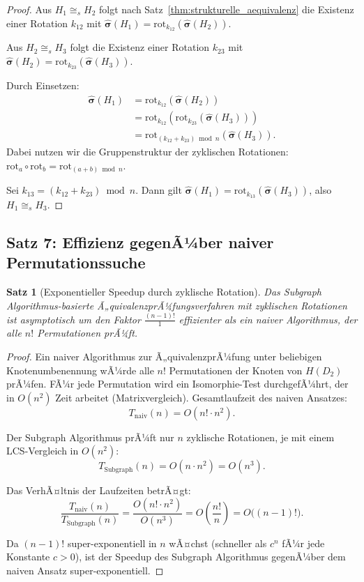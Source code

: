 ﻿\documentclass[12pt,a4paper]{report}
\newtheorem{theorem}{Satz}[section]
\begin{document}
\begin{proof}
Aus $H_1 \cong_s H_2$ folgt nach Satz~\ref{thm:strukturelle_aequivalenz} die Existenz einer Rotation $k_{12}$ mit $\hat{\boldsymbol{\sigma}}(H_1) = \mathrm{rot}_{k_{12}}(\hat{\boldsymbol{\sigma}}(H_2))$.

Aus $H_2 \cong_s H_3$ folgt die Existenz einer Rotation $k_{23}$ mit $\hat{\boldsymbol{\sigma}}(H_2) = \mathrm{rot}_{k_{23}}(\hat{\boldsymbol{\sigma}}(H_3))$.

Durch Einsetzen:
\begin{align*}
\hat{\boldsymbol{\sigma}}(H_1) &= \mathrm{rot}_{k_{12}}(\hat{\boldsymbol{\sigma}}(H_2)) \\
&= \mathrm{rot}_{k_{12}}\!\left(\mathrm{rot}_{k_{23}}(\hat{\boldsymbol{\sigma}}(H_3))\right) \\
&= \mathrm{rot}_{(k_{12} + k_{23}) \bmod n}(\hat{\boldsymbol{\sigma}}(H_3)).
\end{align*}
Dabei nutzen wir die Gruppenstruktur der zyklischen Rotationen: $\mathrm{rot}_a \circ \mathrm{rot}_b = \mathrm{rot}_{(a+b) \bmod n}$.

Sei $k_{13} = (k_{12} + k_{23}) \bmod n$. Dann gilt $\hat{\boldsymbol{\sigma}}(H_1) = \mathrm{rot}_{k_{13}}(\hat{\boldsymbol{\sigma}}(H_3))$, also $H_1 \cong_s H_3$.
\end{proof}

\subsection{Satz 7: Effizienz gegenÃ¼ber naiver Permutationssuche}

\begin{theorem}[Exponentieller Speedup durch zyklische Rotation]
\label{thm:speedup}
Das Subgraph Algorithmus-basierte Ã„quivalenzprÃ¼fungsverfahren mit zyklischen Rotationen ist asymptotisch um den Faktor $\frac{(n-1)!}{1}$ effizienter als ein naiver Algorithmus, der alle $n!$ Permutationen prÃ¼ft.
\end{theorem}

\begin{proof}
Ein naiver Algorithmus zur Ã„quivalenzprÃ¼fung unter beliebigen Knotenumbenennung wÃ¼rde alle $n!$ Permutationen der Knoten von $H(D_2)$ prÃ¼fen. FÃ¼r jede Permutation wird ein Isomorphie-Test durchgefÃ¼hrt, der in $O(n^2)$ Zeit arbeitet (Matrixvergleich). Gesamtlaufzeit des naiven Ansatzes:
\[
T_{\mathrm{naiv}}(n) = O(n! \cdot n^2).
\]

Der Subgraph Algorithmus prÃ¼ft nur $n$ zyklische Rotationen, je mit einem LCS-Vergleich in $O(n^2)$:
\[
T_{\mathrm{Subgraph}}(n) = O(n \cdot n^2) = O(n^3).
\]

Das VerhÃ¤ltnis der Laufzeiten betrÃ¤gt:
\[
\frac{T_{\mathrm{naiv}}(n)}{T_{\mathrm{Subgraph}}(n)} = \frac{O(n! \cdot n^2)}{O(n^3)} = O\!\left(\frac{n!}{n}\right) = O\bigl((n-1)!\bigr).
\]

Da $(n-1)!$ super-exponentiell in $n$ wÃ¤chst (schneller als $c^n$ fÃ¼r jede Konstante $c > 0$), ist der Speedup des Subgraph Algorithmus gegenÃ¼ber dem naiven Ansatz super-exponentiell.
\end{proof}
\end{document}
